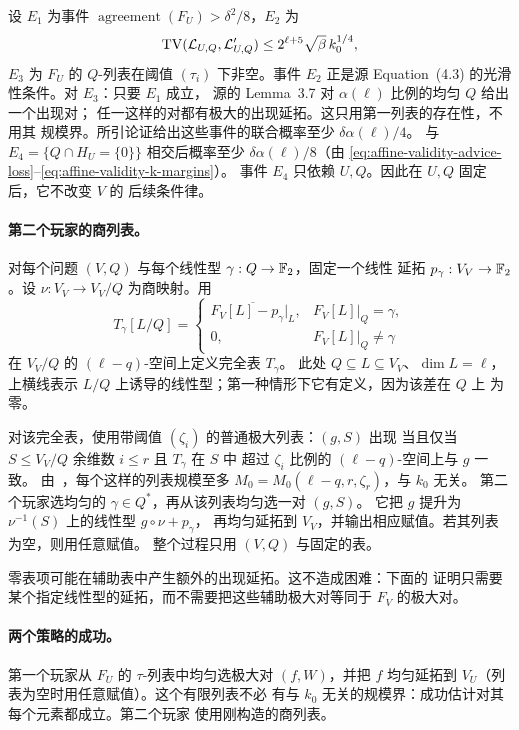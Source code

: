 设 $E_1$ 为事件 $\operatorname{agreement}(F_U)>\delta^2/8$，$E_2$
为
\[
 \operatorname{TV}(\mathcal L_{U,Q},\mathcal L'_{U,Q})
 \le 2^{\ell+5}\sqrt\beta\,k_0^{1/4},
\]
$E_3$ 为 $F_U$ 的 $Q$-列表在阈值 $(\tau_i)$ 下非空。事件 $E_2$
正是源 Equation~(4.3) 的光滑性条件。对 $E_3$：只要 $E_1$ 成立，
源的 Lemma~3.7 对 $\alpha(\ell)$ 比例的均匀 $Q$ 给出一个出现对；
任一这样的对都有极大的出现延拓。这只用第一列表的存在性，不用其
规模界。所引论证给出这些事件的联合概率至少 $\delta\alpha(\ell)/4$。
与 $E_4=\{Q\cap H_U=\{0\}\}$ 相交后概率至少
$\delta\alpha(\ell)/8$（由
\eqref{eq:affine-validity-advice-loss}--\eqref{eq:affine-validity-k-margins}）。
事件 $E_4$ 只依赖 $U,Q$。因此在 $U,Q$ 固定后，它不改变 $V$ 的
后续条件律。

\paragraph{第二个玩家的商列表。}
对每个问题 $(V,Q)$ 与每个线性型 $\gamma:Q\to\mathbb F_2$，固定一个线性
延拓 $p_\gamma:V_V\to\mathbb F_2$。设 $\nu:V_V\to V_V/Q$ 为商映射。用
\[
 T_\gamma[L/Q]=
 \begin{cases}
  \overline{F_V[L]-p_\gamma|_L},&F_V[L]|_Q=\gamma,\\
  0,&F_V[L]|_Q\ne\gamma
 \end{cases}
\]
在 $V_V/Q$ 的 $(\ell-q)$-空间上定义完全表 $T_\gamma$。
此处 $Q\subseteq L\subseteq V_V$、$\dim L=\ell$，上横线表示
$L/Q$ 上诱导的线性型；第一种情形下它有定义，因为该差在 $Q$ 上
为零。

对该完全表，使用带阈值 $(\zeta_i)$ 的普通极大列表：$(g,S)$ 出现
当且仅当 $S\le V_V/Q$ 余维数 $i\le r$ 且 $T_\gamma$ 在 $S$ 中
超过 $\zeta_i$ 比例的 $(\ell-q)$-空间上与 $g$ 一致。
由~\cite[Lemma~3.12]{DKKMS25}，每个这样的列表规模至多
$M_0=M_0(\ell-q,r,\zeta_r)$，与 $k_0$ 无关。
第二个玩家选均匀的 $\gamma\in Q^*$，再从该列表均匀选一对 $(g,S)$。
它把 $g$ 提升为 $\nu^{-1}(S)$ 上的线性型 $g\circ\nu+p_\gamma$，
再均匀延拓到 $V_V$，并输出相应赋值。若其列表为空，则用任意赋值。
整个过程只用 $(V,Q)$ 与固定的表。

零表项可能在辅助表中产生额外的出现延拓。这不造成困难：下面的
证明只需要某个指定线性型的延拓，而不需要把这些辅助极大对等同于
$F_V$ 的极大对。

\paragraph{两个策略的成功。}
第一个玩家从 $F_U$ 的 $\tau$-列表中均匀选极大对 $(f,W)$，并把
$f$ 均匀延拓到 $V_U$（列表为空时用任意赋值）。这个有限列表不必
有与 $k_0$ 无关的规模界：成功估计对其每个元素都成立。第二个玩家
使用刚构造的商列表。

